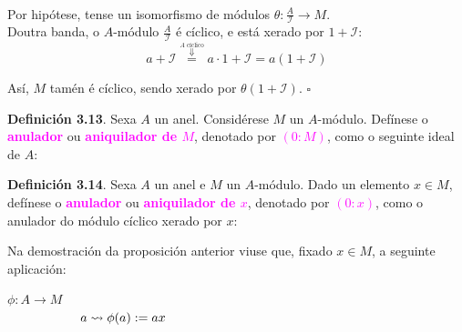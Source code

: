 \documentclass[twoside]{report}
\newcommand{\magbf}[1]{\textcolor{magenta}{\textbf{#1}}} %
\theoremstyle{mystyle}
\begin{document}
\noindent {}\\

\noindent Por hipótese, tense un isomorfismo de módulos $\theta: \displaystyle \frac{A}{\mathcal{I}} \longrightarrow M$.\\

\noindent Doutra banda, o $A$-módulo $\displaystyle \frac{A}{\mathcal{I}}$ é cíclico, e está xerado por $1 + \mathcal{I}$:
$$a + \mathcal{I} \overset{\overset{A \text{ cíclico}}{\Downarrow}}{=} a \cdot 1 + \mathcal{I} = a(1 + \mathcal{I})$$

\noindent Así, $M$ tamén é cíclico, sendo xerado por $\theta(1 + \mathcal{I})$. $\square$ \pagebreak

\noindent \textbf{Definición 3.13}. Sexa $A$ un anel. Considérese $M$ un $A$-módulo. Defínese o \magbf{anulador} ou \magbf{aniquilador de $M$}, denotado por \magbf{$(0:M)$}, como o seguinte ideal de $A$:
\begin{center}
\end{center}

\vspace{3mm}

\noindent \textbf{Definición 3.14}. Sexa $A$ un anel e $M$ un $A$-módulo. Dado un elemento $x \in M$, defínese o \magbf{anulador} ou \magbf{aniquilador de $x$}, denotado por \magbf{$(0 : x)$}, como o anulador do módulo cíclico xerado por $x$:
\begin{center}
\end{center}

\vspace{3mm}

\noindent Na demostración da proposición anterior viuse que, fixado $x \in M$, a seguinte aplicación:
\begin{center}
    $\phi: A \longrightarrow M$\\
    \vspace{2mm}
    $\hspace{20mm} a \leadsto \phi(a) := ax$\\
\end{center}
\end{document}
